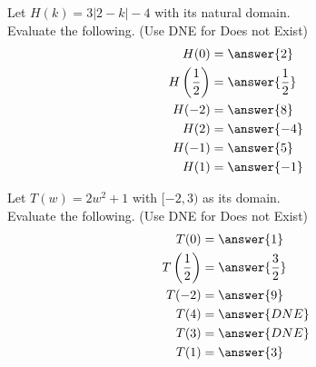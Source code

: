 \documentclass{ximera}
\begin{document}
\begin{exercise}

Let $H(k) = 3 |2-k|-4$ with its natural domain. \\

Evaluate the following.  (Use DNE for Does not Exist) \\


\begin{align*}
H(0) &= \answer{2} \\
H\left(\frac{1}{2}\right) &= \answer{\frac{1}{2}} \\
H(-2)    &= \answer{8} \\
H(2)   &= \answer{-4} \\
H(-1) &= \answer{5}  \\
H(1) &= \answer{-1}
\end{align*}

\end{exercise}


















\begin{exercise}

Let $T(w) = 2 w^2 + 1$ with $[-2, 3)$ as its domain. \\

Evaluate the following.  (Use DNE for Does not Exist) \\


\begin{align*}
T(0) &= \answer{1} \\
T\left(\frac{1}{2}\right) &= \answer{\frac{3}{2}} \\
T(-2)    &= \answer{9} \\
T(4)   &= \answer{DNE} \\
T(3) &= \answer{DNE}  \\
T(1) &= \answer{3}
\end{align*}

\end{exercise}
\end{document}
